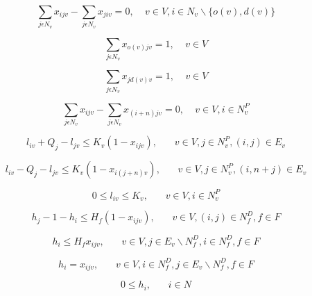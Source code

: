 \documentclass[a4paper,12pt]{article}
\begin{document}
\begin{equation} \label{eq:4}
    \sum_{j\epsilon N_v}x_{ijv} - \sum_{j\epsilon N_v}x_{jiv} = 0, ~~~~~ v \in V, i\in N_v \backslash \{o(v), d(v)\} 
\end{equation}

\begin{equation} \label{eq:5}
    \sum_{j\epsilon N_v}x_{o(v)jv} = 1, ~~~~~ v \in V
\end{equation}

\begin{equation} \label{eq:6}
    \sum_{j\epsilon N_v}x_{j d(v)v} = 1, ~~~~~ v \in V
\end{equation}

\begin{equation} \label{eq:7}
    \sum_{j\epsilon N_v}x_{ijv} - \sum_{j\epsilon N_v}x_{(i+n)jv} = 0, ~~~~~ v \in V, i\in N^P_v
\end{equation}

\begin{equation} \label{eq:8}
    l_{iv} + Q_j - l_{jv} \leq K_v(1-x_{ijv}),~~~~~~~~ v \in V,j\in N_v^P,(i,j) \in E_v
\end{equation}

\begin{equation} \label{eq:9}
    l_{iv} - Q_j - l_{jv} \leq K_v(1-x_{i(j+n)v}), ~~~~~~~~ v \in V,j\in N_v^P, (i, n+j)\in E_v
\end{equation}

\begin{equation} \label{eq:10}
0 \leq l_{iv} \leq K_v, ~~~~~~~~ v \in V, i \in N^P_v
\end{equation}

\begin{equation} \label{eq:11}
    h_{j} - 1 - h_{i} \leq H_f(1-x_{ijv}), ~~~~~~~~ v \in V, (i, j)\in N^D_f, f\in F
\end{equation}

\begin{equation} \label{eq:12}
    h_{i} \leq H_fx_{ijv}, ~~~~~~~~ v\in V, j\in E_v\backslash N_f^D, i\in N_f^D, f\in F
\end{equation}

\begin{equation} \label{eq:13}
    h_{i} = x_{ijv}, ~~~~~~~~ v \in V, i \in N^D_f, j \in E_v\backslash N_f^D, f \in F
\end{equation}

\begin{equation} \label{eq:14}
0 \leq h_{i}, ~~~~~~~~ i \in N
\end{equation}
\end{document}

